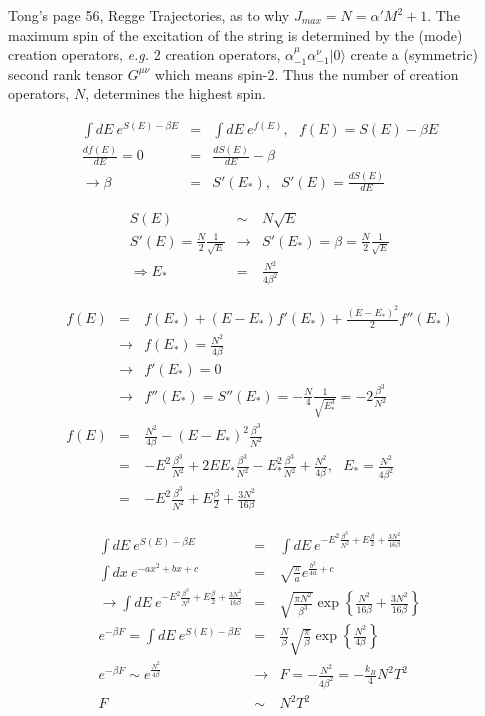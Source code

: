 \documentclass[aps,preprint,preprintnumbers,nofootinbib,showpacs,prd]{revtex4-1}
\newcommand{\eg}{{\it e.g.} }
\newcommand{\nbea}{\begin{eqnarray*}}
\newcommand{\neea}{\end{eqnarray*}}
\begin{document}
Tong's page 56, Regge Trajectories, as to why $J_{max} = N = \alpha' M^2 + 1$. The maximum spin of the excitation of the string is determined by the (mode) creation operators, \eg 2 creation operators, $\alpha_{-1}^\mu \alpha_{-1}^\nu |0\rangle$ create a (symmetric) second rank tensor $G^{\mu\nu}$ which means spin-2. Thus the number of creation operators, $N$, determines the highest spin.



\nbea
\int dE~ e^{S(E) - \beta E} & = & \int dE~ e^{f(E)}, ~~~ f(E) = S(E) - \beta E \\
\frac{d f(E)}{dE} = 0 & = & \frac{d S(E)}{dE} - \beta \\
\rightarrow \beta & = & S'(E_*), ~~~ S'(E) = \frac{d S(E)}{dE}
\neea

\nbea
S(E) & \sim & N \sqrt{E} \\
S'(E) = \frac{N}{2} \frac{1}{\sqrt{E}} & \rightarrow & S'(E_*) = \beta = \frac{N}{2} \frac{1}{\sqrt{E}}\\
\Rightarrow E_* & = & \frac{N^2}{4 \beta^2}
\neea

\nbea
f(E) & = & f(E_*) + (E - E_*) f'(E_*) + \frac{(E - E_*)^2}{2} f''(E_*) \\
& \rightarrow & f(E_*) = \frac{N^2}{4\beta}\\
& \rightarrow & f'(E_*) = 0\\
& \rightarrow & f''(E_*) = S''(E_*) = -\frac{N}{4} \frac{1}{\sqrt{E_*^3}} = -2 \frac{\beta^3}{N^2}\\
f(E) & = & \frac{N^2}{4\beta} - {(E - E_*)^2} \frac{\beta^3}{N^2} \\
& = & - {E^2} \frac{\beta^3}{N^2} + {2 E E_*} \frac{\beta^3}{N^2} - {E_*^2} \frac{\beta^3}{N^2} + \frac{N^2}{4\beta}, ~~~  E_* = \frac{N^2}{4 \beta^2}\\
& = & - {E^2} \frac{\beta^3}{N^2} + E \frac{\beta}{2} + \frac{3N^2}{16\beta}
\neea

\nbea
\int dE~ e^{S(E) - \beta E} & = & \int dE~ e^{- {E^2} \frac{\beta^3}{N^2} + E \frac{\beta}{2} + \frac{3N^2}{16\beta}}\\
\int dx ~ e^{-ax^2 + bx + c} & = & \sqrt{\frac{\pi}{a}} e^{\frac{b^2}{4a} + c} \\
\rightarrow \int dE~ e^{- {E^2} \frac{\beta^3}{N^2} + E \frac{\beta}{2} + \frac{3N^2}{16\beta}} & = & \sqrt{\frac{\pi N^2}{\beta^3}} \exp\left \{\frac{N^2}{16 \beta} + \frac{3N^2}{16\beta} \right \}\\
e^{-\beta F} = \int dE~ e^{S(E) - \beta E} & = & \frac{N}{\beta}\sqrt{\frac{\pi}{\beta}} \exp \left \{\frac{N^2}{4 \beta} \right \} \\
e^{-\beta F} \sim e ^{\frac{N^2}{4 \beta} } & \rightarrow & F = -\frac{N^2}{4\beta^2}  = - \frac{k_B}{4} N^2 T^2\\
F & \sim & N^2 T^2
\neea
\end{document}

